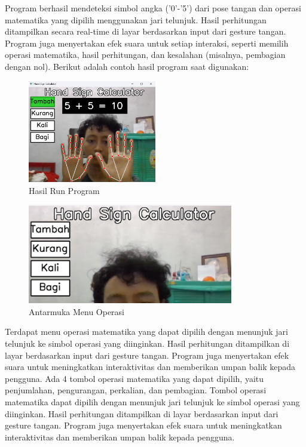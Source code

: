 \documentclass[11pt,a4paper]{article}
\begin{document}
    Program berhasil mendeteksi simbol angka ('0'-'5') dari pose tangan dan operasi matematika yang dipilih menggunakan jari telunjuk. Hasil perhitungan ditampilkan secara real-time di layar berdasarkan input dari gesture tangan. Program juga menyertakan efek suara untuk setiap interaksi, seperti memilih operasi matematika, hasil perhitungan, dan kesalahan (misalnya, pembagian dengan nol). Berikut adalah contoh hasil program saat digunakan:
    \begin{figure}[H]
        \centering
        \includegraphics[width=0.5\textwidth]{Figure/hand-sign-calculator.png}
        \caption{Hasil Run Program}
        \label{fig:hand_sign_calculator}
    \end{figure}
    \begin{figure}[H]
        \centering
        \includegraphics[width=0.8\textwidth]{Figure/menu_button.png}
        \caption{Antarmuka Menu Operasi}
        \label{fig:menu_button}
    \end{figure}
    Terdapat menu operasi matematika yang dapat dipilih dengan menunjuk jari telunjuk ke simbol operasi yang diinginkan. Hasil perhitungan ditampilkan di layar berdasarkan input dari gesture tangan. Program juga menyertakan efek suara untuk meningkatkan interaktivitas dan memberikan umpan balik kepada pengguna. Ada 4 tombol operasi matematika yang dapat dipilih, yaitu penjumlahan, pengurangan, perkalian, dan pembagian. Tombol operasi matematika dapat dipilih dengan menunjuk jari telunjuk ke simbol operasi yang diinginkan. Hasil perhitungan ditampilkan di layar berdasarkan input dari gesture tangan. Program juga menyertakan efek suara untuk meningkatkan interaktivitas dan memberikan umpan balik kepada pengguna.
\end{document}
